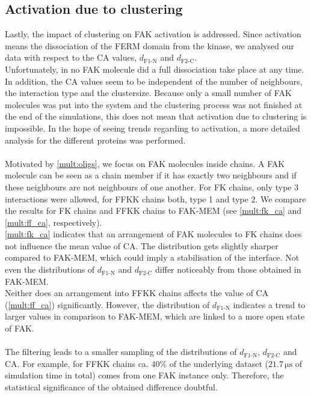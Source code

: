 \subsection{Activation due to clustering}
Lastly, the impact of clustering on FAK activation is addressed. Since activation means the dissociation of the FERM domain from the kinase, we analysed our data with respect to the CA values, $d_\text{F1-N}$ and $d_\text{F2-C}$.\\
Unfortunately, in no FAK molecule did a full dissociation take place at any time. In addition, the CA values seem to be independent of the number of neighbours, the interaction type and the clustersize. Because only a small number of FAK molecules was put into the system and the clustering process was not finished at the end of the simulations, this does not mean that activation due to clustering is impossible. In the hope of seeing trends regarding to activation, a more detailed analysis for the different proteins was performed.\\
\\
Motivated by \autoref{mult:oligs}, we focus on FAK molecules inside chains. A FAK molecule can be seen as a chain member if it has exactly two neighbours and if these neighbours are not neighbours of one another. For FK chains, only type 3 interactions were allowed, for FFKK chains both, type 1 and type 2. We compare the results for FK chains and FFKK chains to FAK-MEM (see \autoref{mult:fk_ca} and \autoref{mult:ff_ca}, respectively).\\
\autoref{mult:fk_ca} indicates that an arrangement of FAK molecules to FK chains does not influence the mean value of CA. The distribution gets slightly sharper compared to FAK-MEM, which could imply a stabilisation of the interface. Not even the distributions of $d_\text{F1-N}$ and $d_\text{F2-C}$ differ noticeably from those obtained in FAK-MEM.\\
Neither does an arrangement into FFKK chains affects the value of CA (\autoref{mult:ff_ca}) significantly. However, the distribution of $d_\text{F1-N}$ indicates a trend to larger values in comparison to FAK-MEM, which are linked to a more open state of FAK.\\
\\
The filtering leads to a smaller sampling of the distributions of $d_\text{F1-N}$, $d_\text{F2-C}$ and CA. For example, for FFKK chains ca. $40\%$ of the underlying dataset ($21.7\,\si{\micro\second}$ of simulation time in total) comes from one FAK instance only. Therefore, the statistical significance of the obtained difference doubtful.
